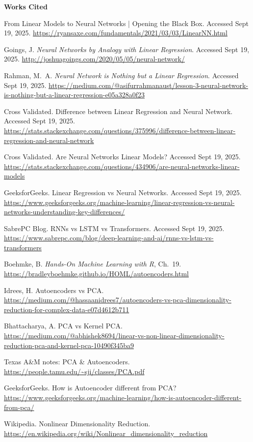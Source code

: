 \documentclass[11pt]{article}
\begin{document}
\bigskip
\noindent\textbf{Works Cited}
\begin{enumerate}[leftmargin=1.2em,label={[\arabic*]}]
\item From Linear Models to Neural Networks | Opening the Black Box. Accessed Sept 19, 2025. \url{https://ryansaxe.com/fundamentals/2021/03/03/LinearNN.html}
\item Goings, J. \emph{Neural Networks by Analogy with Linear Regression}. Accessed Sept 19, 2025. \url{http://joshuagoings.com/2020/05/05/neural-network/}
\item Rahman, M.\ A. \emph{Neural Network is Nothing but a Linear Regression}. Accessed Sept 19, 2025. \url{https://medium.com/@asifurrahmanaust/lesson-3-neural-network-is-nothing-but-a-linear-regression-e05a328a0f23}
\item Cross Validated. Difference between Linear Regression and Neural Network. Accessed Sept 19, 2025. \url{https://stats.stackexchange.com/questions/375996/difference-between-linear-regression-and-neural-network}
\item Cross Validated. Are Neural Networks Linear Models? Accessed Sept 19, 2025. \url{https://stats.stackexchange.com/questions/434906/are-neural-networks-linear-models}
\item GeeksforGeeks. Linear Regression vs Neural Networks. Accessed Sept 19, 2025. \url{https://www.geeksforgeeks.org/machine-learning/linear-regression-vs-neural-networks-understanding-key-differences/}
\item SabrePC Blog. RNNs vs LSTM vs Transformers. Accessed Sept 19, 2025. \url{https://www.sabrepc.com/blog/deep-learning-and-ai/rnns-vs-lstm-vs-transformers}
\item Boehmke, B. \emph{Hands-On Machine Learning with R}, Ch.\ 19. \url{https://bradleyboehmke.github.io/HOML/autoencoders.html}
\item Idrees, H. Autoencoders vs PCA. \url{https://medium.com/@hassaanidrees7/autoencoders-vs-pca-dimensionality-reduction-for-complex-data-e07d4612b711}
\item Bhattacharya, A. PCA vs Kernel PCA. \url{https://medium.com/@abhishek8694/linear-vs-non-linear-dimensionality-reduction-pca-and-kernel-pca-10490f345ba9}
\item Texas A\&M notes: PCA \& Autoencoders. \url{https://people.tamu.edu/~sji/classes/PCA.pdf}
\item GeeksforGeeks. How is Autoencoder different from PCA? \url{https://www.geeksforgeeks.org/machine-learning/how-is-autoencoder-different-from-pca/}
\item Wikipedia. Nonlinear Dimensionality Reduction. \url{https://en.wikipedia.org/wiki/Nonlinear_dimensionality_reduction}

\end{enumerate}
\end{document}
